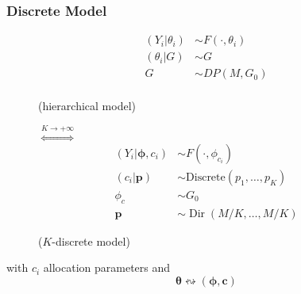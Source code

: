 \begin{frame} %
	\frametitle{Discrete Model}
	\begin{figure}[htpb] 
    	    \begin{align*}
  	 		    (Y_{i}|\theta_{i})&\sim F(\cdot,\theta_i) \\
    	        (\theta_{i}|G)&\sim G \\
            	G & \sim DP(M,G_{0}) \\
      		\end{align*}
        	\begin{center}
        		(hierarchical model)
        	\end{center}
		\endminipage 
			$\stackrel{K\to+\infty}{\iff}$
		\endminipage
        	\begin{align*}
            	(Y_{i}|\mathbf{\phi},c_{i})&\sim F(\cdot,\phi_{c_{i}}) \\
            	(c_{i}|\mathit{\mathbf{p}})&\sim \text{Discrete}(\mathit{p_{1}},\dots,\mathit{p_{K}})\\
            	\phi_{c} & \sim G_{0} \\
            	\mathbf{p} &\sim \operatorname{Dir}(M/K,\dots,M/K)
        	\end{align*}
        	\begin{center}
        		($K$-discrete model)
        	\end{center}
		\endminipage  
	\end{figure}
	\begin{center}
		\vspace{20pt}
		with $c_i$ allocation parameters and
		$$\boldsymbol\theta \leftrightsquigarrow (\boldsymbol\phi, \mathbf c)$$
	\end{center}
\end{frame}




